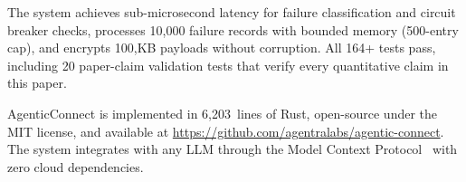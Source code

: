 \documentclass[10pt, twocolumn]{article}
\begin{document}
The system achieves sub-microsecond latency for failure classification and circuit breaker checks, processes 10{,}000 failure records with bounded memory (500-entry cap), and encrypts 100{,}KB payloads without corruption. All 164+ tests pass, including 20 paper-claim validation tests that verify every quantitative claim in this paper.

AgenticConnect is implemented in 6{,}203~lines of Rust, open-source under the MIT license, and available at \url{https://github.com/agentralabs/agentic-connect}. The system integrates with any LLM through the Model Context Protocol~\cite{mcp2024} with zero cloud dependencies.



\end{document}
